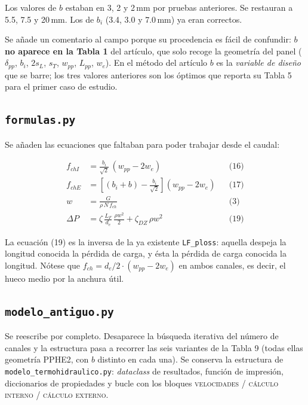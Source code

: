 \documentclass[11pt,a4paper]{article}
\begin{document}
Los valores de $b$ estaban en 3, 2 y 2\,mm por pruebas anteriores. Se restauran a 5.5, 7.5 y
20\,mm. Los de $b_i$ (3.4, 3.0 y 7.0\,mm) ya eran correctos.

Se añade un comentario al campo porque su procedencia es fácil de confundir: \textbf{$b$ no
aparece en la Tabla 1} del artículo, que solo recoge la geometría del panel
($\delta_{pp}$, $b_i$, $2s_L$, $s_T$, $w_{pp}$, $L_{pp}$, $w_e$). En el método del artículo $b$
es la \emph{variable de diseño} que se barre; los tres valores anteriores son los óptimos que
reporta su Tabla 5 para el primer caso de estudio.

\subsection{\texttt{formulas.py}}

Se añaden las ecuaciones que faltaban para poder trabajar desde el caudal:

\begin{align}
  f_{chI} &= \frac{b_i}{\sqrt{2}}\,(w_{pp}-2w_e) & &\text{(16)}\\
  f_{chE} &= \left[(b_i+b)-\frac{b_i}{\sqrt{2}}\right](w_{pp}-2w_e) & &\text{(17)}\\
  w &= \frac{G}{\rho\,N\,f_{ch}} & &\text{(3)}\\
  \Delta P &= \zeta\,\frac{L_F}{d_e}\,\frac{\rho w^2}{2} + \zeta_{DZ}\,\rho w^2 & &\text{(19)}
\end{align}

La ecuación (19) es la inversa de la ya existente \texttt{LF\_ploss}: aquella despeja la
longitud conocida la pérdida de carga, y ésta la pérdida de carga conocida la longitud.
Nótese que $f_{ch} = d_e/2 \cdot (w_{pp}-2w_e)$ en ambos canales, es decir, el hueco medio por
la anchura útil.

\subsection{\texttt{modelo\_antiguo.py}}

Se reescribe por completo. Desaparece la búsqueda iterativa del número de canales y la
estructura pasa a recorrer las seis variantes de la Tabla 9 (todas ellas geometría PPHE2, con
$b$ distinto en cada una). Se conserva la estructura de \texttt{modelo\_termohidraulico.py}:
\emph{dataclass} de resultados, función de impresión, diccionarios de propiedades y bucle con
los bloques \textsc{velocidades} / \textsc{cálculo interno} / \textsc{cálculo externo}.
\end{document}
